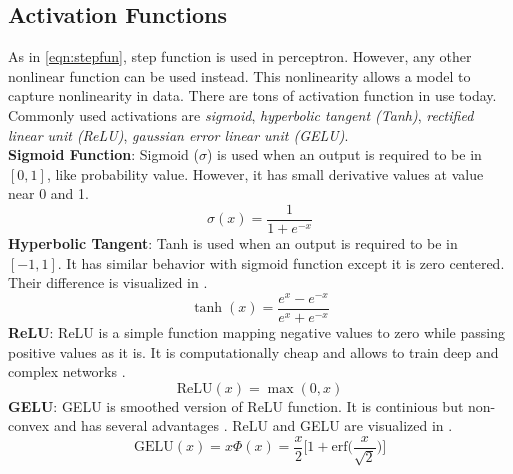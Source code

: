 \subsection{Activation Functions}
As in \eqref{eqn:stepfun}, step function is used in perceptron. However, any other nonlinear function can be used instead. This nonlinearity allows a model to capture nonlinearity in data. There are tons of activation function in use today. Commonly used activations are \textit{sigmoid}, \textit{hyperbolic tangent (Tanh)}, \textit{rectified linear unit (ReLU)}, \textit{gaussian error linear unit (GELU)}. \\
\textbf{Sigmoid Function}: Sigmoid ($\sigma$) is used when an output is required to be in $[0,1]$, like probability value. However, it has small derivative values at value near 0 and 1. \\
\begin{equation}
\label{eqn:sigmoid_fcn}
\sigma(x) = \frac{1}{1+e^{-x}}
\end{equation}
\textbf{Hyperbolic Tangent}: Tanh is used when an output is required to be in $[-1,1]$. It has similar behavior with sigmoid function except it is zero centered. Their difference is visualized in . \\
\begin{equation}
\label{eqn:tanh_fcn}
\tanh(x) = \frac{e^x - e^{-x}}{e^x + e^{-x}}
\end{equation}
\textbf{ReLU}: ReLU is a simple function mapping negative values to zero while passing positive values as it is. It is computationally cheap and allows to train deep and complex networks \cite{glorot_deep_2011}. \\
\begin{equation}
\label{eqn:relu_fcn}
\textrm{ReLU}(x) = \max(0, x)
\end{equation}
\textbf{GELU}: GELU is smoothed version of ReLU function. It is continious but non-convex and has several advantages \cite{hendrycks_gaussian_2020}. ReLU and GELU are visualized in  . \\
\begin{equation}
\label{eqn:gelu_fcn}
\textrm{GELU}(x) = x \Phi(x) = \frac{x}{2} \bigg[ 1 + \textrm{erf} \Big( \frac{x}{\sqrt{2}} \Big) \bigg]
\end{equation}
